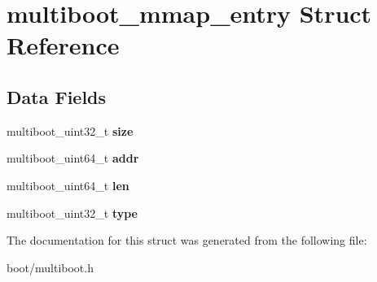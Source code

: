\hypertarget{structmultiboot__mmap__entry}{
\section{multiboot\_\-mmap\_\-entry Struct Reference}
\label{structmultiboot__mmap__entry}
}
\subsection*{Data Fields}
\begin{DoxyCompactItemize}
\item 
\hypertarget{structmultiboot__mmap__entry_af10c1835051b4b08bdcdb538c1b4101d}{
multiboot\_\-uint32\_\-t {\bfseries size}}
\label{structmultiboot__mmap__entry_af10c1835051b4b08bdcdb538c1b4101d}

\item 
\hypertarget{structmultiboot__mmap__entry_a3f76a637264b83e30967bcd808ff403c}{
multiboot\_\-uint64\_\-t {\bfseries addr}}
\label{structmultiboot__mmap__entry_a3f76a637264b83e30967bcd808ff403c}

\item 
\hypertarget{structmultiboot__mmap__entry_a6bfa44919a328492fa4e3d6239a23352}{
multiboot\_\-uint64\_\-t {\bfseries len}}
\label{structmultiboot__mmap__entry_a6bfa44919a328492fa4e3d6239a23352}

\item 
\hypertarget{structmultiboot__mmap__entry_aa6fc447c57f074d0babfe3bbb7017de9}{
multiboot\_\-uint32\_\-t {\bfseries type}}
\label{structmultiboot__mmap__entry_aa6fc447c57f074d0babfe3bbb7017de9}

\end{DoxyCompactItemize}


The documentation for this struct was generated from the following file:\begin{DoxyCompactItemize}
\item 
boot/multiboot.h\end{DoxyCompactItemize}
